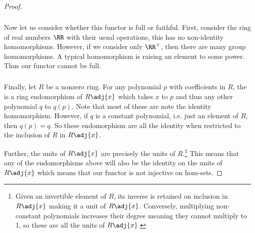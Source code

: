 \documentclass[main.tex]{subfiles}
\begin{document}
\begin{proof}
	\subparagraph{}
	Now let us consider whether this functor is full or faithful. First,
	consider the ring of real numbers \(\RR\) with their usual operations, this
	has no non-identity homomorphisms. However, if we consider only
	\(\RR^\times\), then there are many group homomorphisms. A typical
	homomorphism is raising an element to some power. Thus our functor cannot be
	full.

	\subparagraph{}
	Finally, let \(R\) be a nonzero ring. For any polynomial \(p\) with
	coefficients in \(R\), the is a ring endomorphism of \(R\adj{x}\) which
	takes \(x\) to \(p\) and thus any other polynomial \(q\) to \(q(p)\). Note
	that most of these are note the identity homomorphism. However, if \(q\) is
	a constant polynomial, i.e. just an element of \(R\), then \(q(p)=q\). So
	these endomorphism are all the identity when restricted to the inclusion of
	\(R\) in \(R\adj{x}\).

	Further, the units of \(R\adj{x}\) are precisely the units of
	\(R\).\footnote{Given an invertible element of \(R\), its inverse is
		retained on inclusion in \(R\adj{x}\) making it a unit of \(R\adj{x}\).
		Conversely, multiplying non-constant polynomials increases their degree
		meaning they cannot multiply to 1, so these are all the units of
	\(R\adj{x}\).} This means that any of the endomorphisms above will also be
	the identity on the units of \(R\adj{x}\) which means that our functor is
	not injective on hom-sets.
\end{proof}
\end{document}
